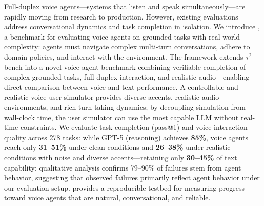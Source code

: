 
Full-duplex voice agents—systems that listen and speak simultaneously—are rapidly moving from research to production. However, existing evaluations address conversational dynamics and task completion in isolation. We introduce \textbf{\tauvoice{}}, a benchmark for evaluating voice agents on grounded tasks with real-world complexity: agents must navigate complex multi-turn conversations, adhere to domain policies, and interact with the environment. The framework extends $\tau^2$-bench into a novel voice agent benchmark combining verifiable completion of complex grounded tasks, full-duplex interaction, and realistic audio—enabling direct comparison between voice and text performance. A controllable and realistic voice user simulator provides diverse accents, realistic audio environments, and rich turn-taking dynamics; by decoupling simulation from wall-clock time, the user simulator can use the most capable LLM without real-time constraints. We evaluate task completion (pass@1) and voice interaction quality across 278 tasks: while GPT-5 (reasoning) achieves \textbf{85\%}, voice agents reach only \textbf{31--51\%} under clean conditions and \textbf{26--38\%} under realistic conditions with noise and diverse accents—retaining only \textbf{30--45\%} of text capability; qualitative analysis confirms 79--90\% of failures stem from agent behavior, suggesting that observed failures primarily reflect agent behavior under our evaluation setup. \tauvoice{} provides a reproducible testbed for measuring progress toward voice agents that are natural, conversational, and reliable.

